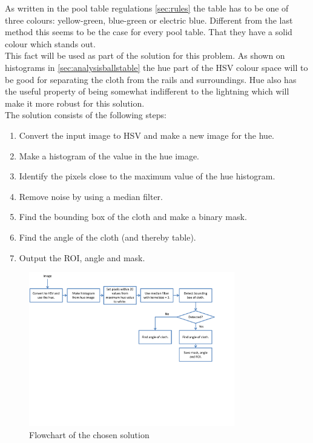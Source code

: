As written in the pool table regulations \ref{sec:rules} the table has to be one of three colours: yellow-green, blue-green or electric blue. Different from the last method this seems to be the case for every pool table. That they have a solid colour which stands out.\\

This fact will be used as part of the solution for this problem. As shown on histograms in \ref{sec:analysisballstable} the hue part of the HSV colour space will to be good for separating the cloth from the rails and surroundings. Hue also has the useful property of being somewhat indifferent to the lightning which will make it more robust for this solution.\\


The solution consists of the following steps:
\begin{enumerate}
\setlength{\itemsep}{0mm}
	\item Convert the input image to HSV and make a new image for the hue.
	\item Make a histogram of the value in the hue image.
	\item Identify the pixels close to the maximum value of the hue histogram.
	\item Remove noise by using a median filter.
	\item Find the bounding box of the cloth and make a binary mask.
	\item Find the angle of the cloth (and thereby table).
	\item Output the ROI, angle and mask.
\end{enumerate}

\begin{figure}[H]
\begin{center}
\leavevmode
\includegraphics[width=0.8\textwidth]{images/tabledetect_flowchart}
\end{center}
\caption{Flowchart of the chosen solution}
\label{fig:tabledetect_flowchart}
\end{figure}


